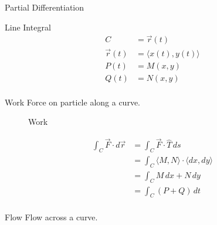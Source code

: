 \begin{section}{Partial Differentiation}
  \begin{section}{Line Integral}
    \begin{align*}
      C &=\vec{r}(t) \\
      \vec{r}(t) &=\langle x(t),y(t) \rangle  \\
      P(t) &= M(x,y) \\
      Q(t) &= N(x,y) \\
    \end{align*}
    \begin{subsection}{Work}
      Force on particle along a curve.
      \begin{figure}[H]
        \begin{center}
          \caption{Work}
        \end{center}
      \end{figure}
      \begin{align*}
        \int_C \vec{F} \cdot d\vec{r} &= \int_C \vec{F} \cdot \hat{T} \, ds \\
                                      &= \int_C \langle M,N \rangle \cdot \langle dx,dy \rangle \\
                                      &= \int_C M\,dx + N\,dy \\
                                      &= \int_C (P + Q) \,dt \\
      \end{align*}
    \end{subsection} %
    \begin{subsection}{Flow}
      Flow across a curve.
      \begin{figure}[H]
        \begin{center}

\end{center}
\end{figure}
\end{subsection}
\end{section}
\end{section}
